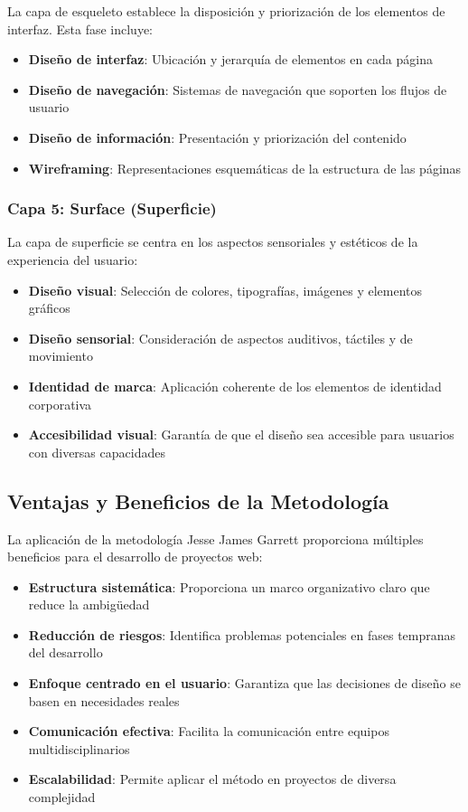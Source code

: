 La capa de esqueleto establece la disposición y priorización de los elementos de interfaz. Esta fase incluye:

\begin{itemize}
    \item \textbf{Diseño de interfaz}: Ubicación y jerarquía de elementos en cada página
    \item \textbf{Diseño de navegación}: Sistemas de navegación que soporten los flujos de usuario
    \item \textbf{Diseño de información}: Presentación y priorización del contenido
    \item \textbf{Wireframing}: Representaciones esquemáticas de la estructura de las páginas
\end{itemize}

\subsubsection{Capa 5: Surface (Superficie)}

La capa de superficie se centra en los aspectos sensoriales y estéticos de la experiencia del usuario:

\begin{itemize}
    \item \textbf{Diseño visual}: Selección de colores, tipografías, imágenes y elementos gráficos
    \item \textbf{Diseño sensorial}: Consideración de aspectos auditivos, táctiles y de movimiento
    \item \textbf{Identidad de marca}: Aplicación coherente de los elementos de identidad corporativa
    \item \textbf{Accesibilidad visual}: Garantía de que el diseño sea accesible para usuarios con diversas capacidades
\end{itemize}

\subsection{Ventajas y Beneficios de la Metodología}

La aplicación de la metodología Jesse James Garrett proporciona múltiples beneficios para el desarrollo de proyectos web:

\begin{itemize}
    \item \textbf{Estructura sistemática}: Proporciona un marco organizativo claro que reduce la ambigüedad
    \item \textbf{Reducción de riesgos}: Identifica problemas potenciales en fases tempranas del desarrollo
    \item \textbf{Enfoque centrado en el usuario}: Garantiza que las decisiones de diseño se basen en necesidades reales
    \item \textbf{Comunicación efectiva}: Facilita la comunicación entre equipos multidisciplinarios
    \item \textbf{Escalabilidad}: Permite aplicar el método en proyectos de diversa complejidad
\end{itemize}

